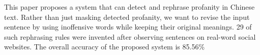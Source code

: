 This paper proposes a system that can detect and rephrase profanity in Chinese text.  Rather than just masking detected profanity, we want to revise the input sentence by using inoffensive words while keeping their original meanings.  29 of such rephrasing rules were invented after observing sentences on real-word social websites.  The overall accuracy of the proposed system is 85.56\%
